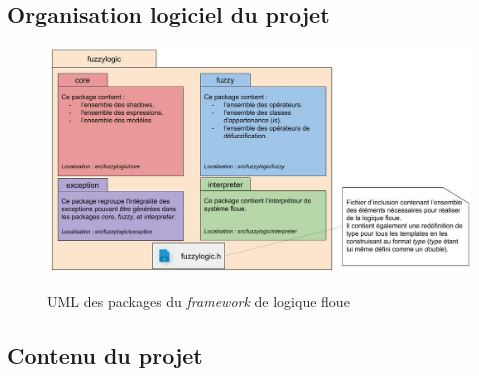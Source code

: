 \documentclass[a4paper,11pt]{article}
\begin{document}
    \subsection{Organisation logiciel du projet}

    \begin{figure}[H]
        \begin{center}
            \caption{UML des packages du \textit{framework} de logique floue}
            \includegraphics[scale=0.51]{assets/Packages_(UML).jpg}
            \label{fig:umlPackage}
        \end{center}
    \end{figure}

    \subsection{Contenu du projet}
\end{document}
